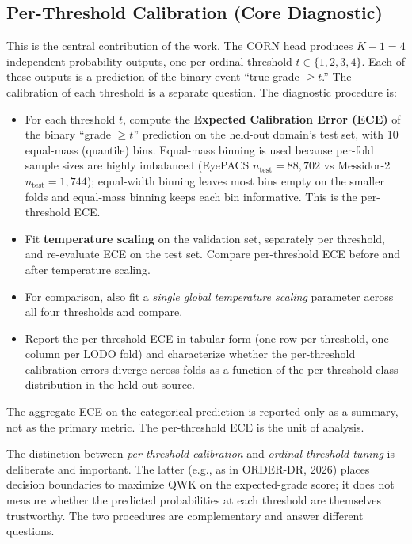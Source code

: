 \documentclass[11pt]{article}
\begin{document}
\subsection{Per-Threshold Calibration (Core Diagnostic)}
\label{sec:per-threshold}
This is the central contribution of the work. The CORN head produces $K-1 = 4$ independent probability outputs, one per ordinal threshold $t \in \{1, 2, 3, 4\}$. Each of these outputs is a prediction of the binary event ``true grade $\geq t$.'' The calibration of each threshold is a separate question. The diagnostic procedure is:
\begin{itemize}[leftmargin=*, topsep=0pt]
  \item For each threshold $t$, compute the \textbf{Expected Calibration Error (ECE)} of the binary ``grade $\geq t$'' prediction on the held-out domain's test set, with 10 equal-mass (quantile) bins. Equal-mass binning is used because per-fold sample sizes are highly imbalanced (EyePACS $n_{\mathrm{test}} = 88{,}702$ vs Messidor-2 $n_{\mathrm{test}} = 1{,}744$); equal-width binning leaves most bins empty on the smaller folds and equal-mass binning keeps each bin informative. This is the per-threshold ECE.
  \item Fit \textbf{temperature scaling} on the validation set, separately per threshold, and re-evaluate ECE on the test set. Compare per-threshold ECE before and after temperature scaling.
  \item For comparison, also fit a \emph{single global temperature scaling} parameter across all four thresholds and compare.
  \item Report the per-threshold ECE in tabular form (one row per threshold, one column per LODO fold) and characterize whether the per-threshold calibration errors diverge across folds as a function of the per-threshold class distribution in the held-out source.
\end{itemize}

The aggregate ECE on the categorical prediction is reported only as a summary, not as the primary metric. The per-threshold ECE is the unit of analysis.

The distinction between \emph{per-threshold calibration} and \emph{ordinal threshold tuning} is deliberate and important. The latter (e.g., as in ORDER-DR, 2026) places decision boundaries to maximize QWK on the expected-grade score; it does not measure whether the predicted probabilities at each threshold are themselves trustworthy. The two procedures are complementary and answer different questions.
\end{document}
